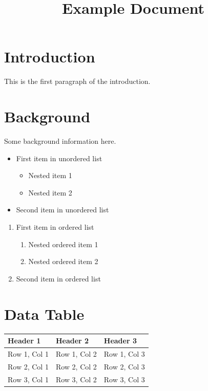 \documentclass[11pt,a4paper]{article}
\title{Example Document}
\begin{document}
\maketitle

\section{Introduction}

This is the first paragraph of the introduction.

\section{Background}

Some background information here.

\begin{itemize}
\item First item in unordered list
  \begin{itemize}
\item Nested item 1
\item Nested item 2
  \end{itemize}
\item Second item in unordered list
\end{itemize}

\begin{enumerate}
\item First item in ordered list
  \begin{enumerate}
\item Nested ordered item 1
\item Nested ordered item 2
  \end{enumerate}
\item Second item in ordered list
\end{enumerate}

\section{Data Table}

\begin{table}[h]
\begin{tabular}{|l|l|l|}
\hline
Header 1 & Header 2 & Header 3 \\ \hline
Row 1, Col 1 & Row 1, Col 2 & Row 1, Col 3 \\ \hline
Row 2, Col 1 & Row 2, Col 2 & Row 2, Col 3 \\ \hline
Row 3, Col 1 & Row 3, Col 2 & Row 3, Col 3 \\ \hline
\end{tabular}
\end{table}
\end{document}
